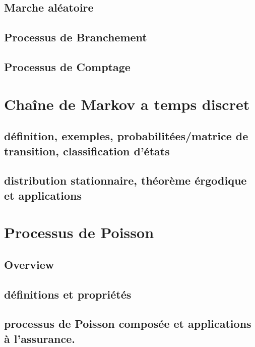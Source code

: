 \documentclass{article}
\begin{document}
\begin{definition}
\end{definition}

\begin{definition}
\end{definition}

\subsection{Marche aléatoire}



\subsection{Processus de Branchement}
\subsection{Processus de Comptage}




\section{Chaîne de Markov a temps discret}
\subsection{définition, exemples, probabilitées/matrice de transition, classification d’états}
\subsection{distribution stationnaire, théorème érgodique et applications}
\pagebreak

\section{Processus de Poisson}
\subsection{Overview}
\subsection{définitions et propriétés}
\subsection{processus de Poisson composée et applications à l’assurance.}
\pagebreak
\end{document}
